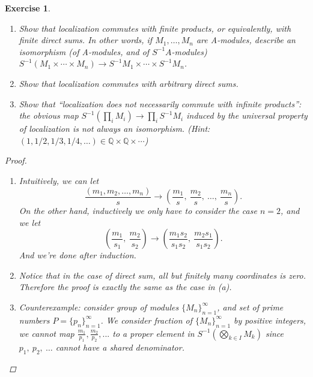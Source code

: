 \documentclass{article}
\theoremstyle{breakstyle}
\newtheorem{exercise}{Exercise}[section]
\begin{document}
\begin{exercise}
\begin{enumerate}[label=({\alph*})]
\item Show that localization commutes with finite products, or
    equivalently, with finite direct sums. In other words, if
    $M_{1},\ldots,M_{n}$ are A-modules, describe an isomorphism (of
    A-modules, and of $S^{-1}A$-modules)
    $S^{-1}(M_{1}\times\cdots\times M_{n}) \to S^{-1}M_{1}\times\cdots\times
    S^{-1}M_{n}$.
\item Show that localization commutes with arbitrary direct sums.
\item Show that ``localization does not necessarily commute with infinite
    products'': the obvious map $S^{-1}(\prod_{i}M_{i}) \to \prod_{i}
    S^{-1}M_{i}$ induced by the universal property of localization is not
    always an isomorphism. (Hint:
    $(1,1/2,1/3,1/4,\ldots)\in\mathbb{Q}\times\mathbb{Q}\times\cdots$)
\end{enumerate}

\begin{proof}
	\begin{enumerate}
		\item Intuitively, we can let
			$$
            \frac{(m_{1},m_{2},\ldots ,m_{n})}{s} \longrightarrow \left(
            \frac{m_{1}}{s},\ \frac{m_{2}}{s},\ \ldots,\ \frac{m_{n}}{s} \right) 
			.$$ 
            On the other hand, inductively we only have to consider the case
            $n=2$, and we let
			$$
            \left( \frac{m_{1}}{s_{1}},\ \frac{m_{2}}{s_{2}} \right)
            \longrightarrow \left( \frac{m_{1}s_{2}}{s_{1}s_{2}},\
            \frac{m_{2}s_{1}}{s_{1}s_{2}} \right) 
			.$$ 
			And we're done after induction.
        \item Notice that in the case of direct sum, all but finitely many
            coordinates is zero. Therefore the proof is exactly the same as the
            case in \emph{(a)}.
        \item Counterexample: consider group of modules
            $\{M_{n}\}_{n=1}^{\infty}$, and set of prime numbers
            $P=\{p_{n}\}_{n=1}^{\infty}$. We consider fraction of
            $\{M_{n}\}_{n=1}^{\infty}$ by positive integers, we cannot map
            ${\frac{m_1}{p_1},\frac{m_2}{p_2},...}$ to a proper element in
            $S^{-1}\left( \bigotimes _{k \in I}M_{k} \right) $ since $p_{1},\
            p_{2},\ \ldots$ cannot have a shared denominator.
	\end{enumerate}
\end{proof}

\end{exercise}
\end{document}
